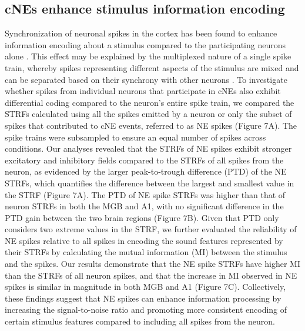 \documentclass[11pt]{article}
\begin{document}
\subsection*{cNEs enhance stimulus information encoding}
Synchronization of neuronal spikes in the cortex has been found to enhance information encoding about a stimulus compared to the participating neurons alone \citep{dan1998coding, See2018, atencio2013auditory}. This effect may be explained by the multiplexed nature of a single spike train, whereby spikes representing different aspects of the stimulus are mixed and can be separated based on their synchrony with other neurons \citep{lankarany2019, See2021}. To investigate whether spikes from individual neurons that participate in cNEs also exhibit differential coding compared to the neuron's entire spike train, we compared the STRFs calculated using all the spikes emitted by a neuron or only the subset of spikes that contributed to cNE events, referred to as NE spikes (Figure 7A). The spike trains were subsampled to ensure an equal number of spikes across conditions. Our analyses revealed that the STRFs of NE spikes exhibit stronger excitatory and inhibitory fields compared to the STRFs of all spikes from the neuron, as evidenced by the larger peak-to-trough difference (PTD) of the NE STRFs, which quantifies the difference between the largest and smallest value in the STRF (Figure 7A). The PTD of NE spike STRFs was higher than that of neuron STRFs in both the MGB and A1, with no significant difference in the PTD gain between the two brain regions (Figure 7B). Given that PTD only considers two extreme values in the STRF, we further evaluated the reliability of NE spikes relative to all spikes in encoding the sound features represented by their STRFs by calculating the mutual information (MI) between the stimulus and the spikes. Our results demonstrate that the NE spike STRFs have higher MI than the STRFs of all neuron spikes, and that the increase in MI observed in NE spikes is similar in magnitude in both MGB and A1 (Figure 7C). Collectively, these findings suggest that NE spikes can enhance information processing by increasing the signal-to-noise ratio and promoting more consistent encoding of certain stimulus features compared to including all spikes from the neuron.
\end{document}
